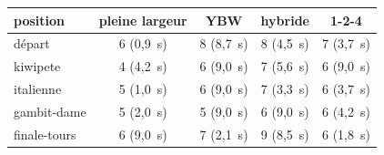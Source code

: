 \begin{tabular}{lcccc}
\toprule
position & pleine largeur & YBW & hybride & 1-2-4\\
\midrule
départ & 6 (0{,}9~s) & 8 (8{,}7~s) & 8 (4{,}5~s) & 7 (3{,}7~s)\\
kiwipete & 4 (4{,}2~s) & 6 (9{,}0~s) & 7 (5{,}6~s) & 6 (9{,}0~s)\\
italienne & 5 (1{,}0~s) & 6 (9{,}0~s) & 7 (3{,}3~s) & 6 (3{,}7~s)\\
gambit-dame & 5 (2{,}0~s) & 5 (9{,}0~s) & 6 (9{,}0~s) & 6 (4{,}2~s)\\
finale-tours & 6 (9{,}0~s) & 7 (2{,}1~s) & 9 (8{,}5~s) & 6 (1{,}8~s)\\
\bottomrule
\end{tabular}
